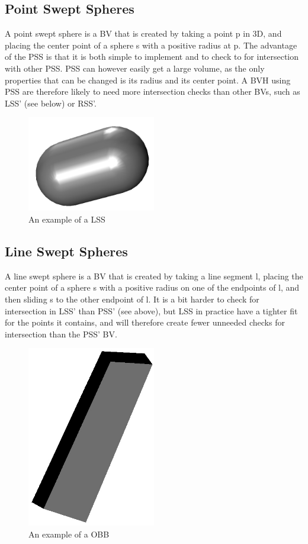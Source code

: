 \subsection{Point Swept Spheres}
A point swept sphere is a BV that is created by taking a point p in 3D, and placing the center point of a sphere s with a positive radius at p. The advantage of the PSS is that it is both simple to implement and to check to for intersection with other PSS. PSS can however easily get a large volume, as the only properties that can be changed is its radius and its center point. A BVH using PSS are therefore likely to need more intersection checks than other BVs, such as LSS' (see below) or RSS'.

\begin{figure}
\centering
\includegraphics[width=0.5\textwidth]{figures/lss}
\caption{\label{lss-example}An example of a LSS}
\end{figure}

\subsection{Line Swept Spheres}
A line swept sphere is a BV that is created by taking a line segment l, placing the center point of a sphere s with a positive radius on one of the endpoints of l, and then sliding s to the other endpoint of l. It is a bit harder to check for intersection in LSS' than PSS' (see above), but LSS in practice have a tighter fit for the points it contains, and will therefore create fewer unneeded checks for intersection than the PSS' BV.

\begin{figure}
\centering
\includegraphics[width=0.5\textwidth]{figures/obb}
\caption{\label{obb-example}An example of a OBB}
\end{figure}

